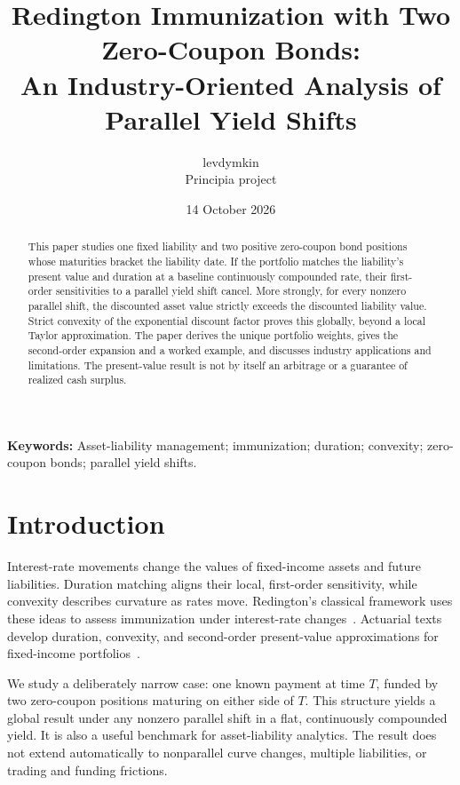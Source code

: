 \documentclass[11pt]{article}
\title{Redington Immunization with Two Zero-Coupon Bonds:\\An Industry-Oriented Analysis of Parallel Yield Shifts}
\author{levdymkin\\Principia project}
\date{14 October 2026}
\begin{document}
\maketitle
\begin{abstract}
This paper studies one fixed liability and two positive zero-coupon bond positions whose maturities bracket the liability date. If the portfolio matches the liability's present value and duration at a baseline continuously compounded rate, their first-order sensitivities to a parallel yield shift cancel. More strongly, for every nonzero parallel shift, the discounted asset value strictly exceeds the discounted liability value. Strict convexity of the exponential discount factor proves this globally, beyond a local Taylor approximation. The paper derives the unique portfolio weights, gives the second-order expansion and a worked example, and discusses industry applications and limitations. The present-value result is not by itself an arbitrage or a guarantee of realized cash surplus.
\end{abstract}
\noindent\textbf{Keywords:} Asset-liability management; immunization; duration; convexity; zero-coupon bonds; parallel yield shifts.

\section{Introduction}
Interest-rate movements change the values of fixed-income assets and future liabilities. Duration matching aligns their local, first-order sensitivity, while convexity describes curvature as rates move. Redington's classical framework uses these ideas to assess immunization under interest-rate changes~\cite{redington}. Actuarial texts develop duration, convexity, and second-order present-value approximations for fixed-income portfolios~\cite{broverman}.

We study a deliberately narrow case: one known payment at time \(T\), funded by two zero-coupon positions maturing on either side of \(T\). This structure yields a global result under any nonzero parallel shift in a flat, continuously compounded yield. It is also a useful benchmark for asset-liability analytics. The result does not extend automatically to nonparallel curve changes, multiple liabilities, or trading and funding frictions.
\end{document}
